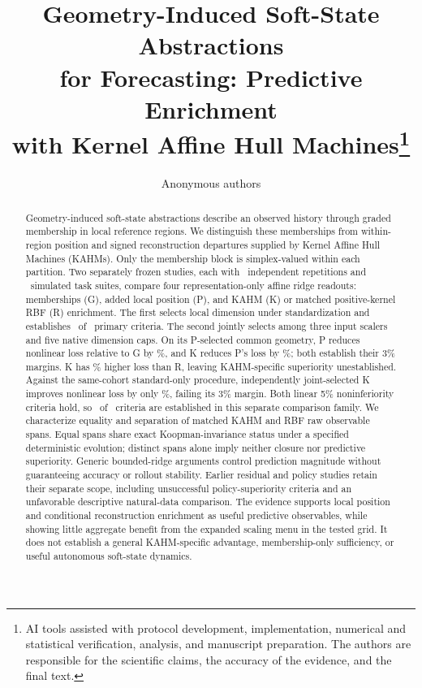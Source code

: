 \documentclass[10pt]{article}
\title{Geometry-Induced Soft-State Abstractions\\
for Forecasting: Predictive Enrichment\\
with Kernel Affine Hull Machines\thanks{AI tools assisted with protocol development, implementation, numerical and statistical verification, analysis, and manuscript preparation. The authors are responsible for the scientific claims, the accuracy of the evidence, and the final text.}}
\author{Anonymous authors}
\begin{document}
\maketitle
\begin{abstract}
Geometry-induced soft-state abstractions describe an observed history
through graded membership in local reference regions. We distinguish
these memberships from within-region position and signed reconstruction
departures supplied by Kernel Affine Hull Machines (KAHMs). Only the
membership block is simplex-valued within each partition. Two separately
frozen studies, each with \SARepetitions\ independent repetitions and
\SATasks\ simulated task suites, compare four representation-only affine
ridge readouts: memberships (G), added local position (P), and KAHM (K)
or matched positive-kernel RBF (R) enrichment. The first selects local
dimension under standardization and establishes \SACriteriaEstablished\
of \SAFamilySize\ primary criteria. The second jointly selects among
three input scalers and five native dimension caps. On its P-selected
common geometry, P reduces nonlinear loss relative to G by
\JSGainPG\%, and K reduces P's loss by \JSGainKP\%; both establish
their 3\% margins. K has \JSRelativeLossChangeKR\% higher loss than R,
leaving KAHM-specific superiority unestablished. Against the same-cohort
standard-only procedure, independently joint-selected K improves nonlinear
loss by only \JSGainJointKNonlinear\%, failing its 3\% margin.
Both linear 5\% noninferiority criteria hold, so
\JSCriteriaEstablished\ of \JSFamilySize\ criteria are established
in this separate comparison family.
We characterize equality and separation of matched KAHM and RBF raw
observable spans. Equal spans share exact Koopman-invariance status
under a specified deterministic evolution; distinct spans alone imply
neither closure nor predictive superiority. Generic bounded-ridge
arguments control prediction magnitude without guaranteeing accuracy
or rollout stability. Earlier residual and policy studies retain their
separate scope, including unsuccessful policy-superiority criteria and
an unfavorable descriptive natural-data comparison. The evidence
supports local position and conditional reconstruction enrichment as
useful predictive observables, while showing little aggregate benefit
from the expanded scaling menu in the tested grid. It does not establish
a general KAHM-specific advantage, membership-only sufficiency, or useful
autonomous soft-state dynamics.
\end{abstract}










\FloatBarrier






\appendix
\FloatBarrier

\FloatBarrier

\FloatBarrier

\end{document}
